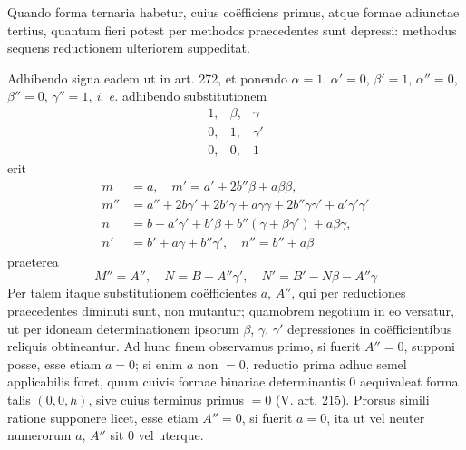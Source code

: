 Quando forma ternaria habetur, cuius co\"efficiens primus, atque formae adiunctae tertius, quantum fieri potest per methodos praecedentes sunt depressi: methodus sequens reductionem ulteriorem suppeditat.

Adhibendo signa eadem ut in art. 272, et ponendo \(\alpha=1\), \(\alpha'=0\), \(\beta'=1\), \(\alpha''=0\), \(\beta''=0\), \(\gamma''=1\), \emph{i. e.} adhibendo substitutionem
\[
\begin{array}{ccc}
1,&\beta,&\gamma\\
0,&1,&\gamma'\\
0,&0,&1
\end{array}
\]
erit
\[
\begin{aligned}
m&=a,\quad m'=a'+2b''\beta+a\beta\beta,\\
m''&=a''+2b\gamma'+2b'\gamma+a\gamma\gamma+2b''\gamma\gamma'+a'\gamma'\gamma'\\
n&=b+a'\gamma'+b'\beta+b''(\gamma+\beta\gamma')+a\beta\gamma,\\
n'&=b'+a\gamma+b''\gamma',\quad n''=b''+a\beta
\end{aligned}
\]
praeterea
\[
M''=A'',\quad N=B-A''\gamma',\quad N'=B'-N\beta-A''\gamma
\]
Per talem itaque substitutionem co\"efficientes \(a\), \(A''\), qui per reductiones praecedentes diminuti sunt, non mutantur; quamobrem negotium in eo versatur, ut per idoneam determinationem ipsorum \(\beta\), \(\gamma\), \(\gamma'\) depressiones in co\"efficientibus reliquis obtineantur. Ad hunc finem observamus primo, si fuerit \(A''=0\), supponi posse, esse etiam \(a=0\); si enim \(a\) non \(=0\), reductio prima adhuc semel applicabilis foret, quum cuivis formae binariae determinantis \(0\) aequivaleat forma talis \((0,0,h)\), sive cuius terminus primus \(=0\) (V. art. 215). Prorsus simili ratione supponere licet, esse etiam \(A''=0\), si fuerit \(a=0\), ita ut vel neuter numerorum \(a\), \(A''\) sit \(0\) vel uterque.

